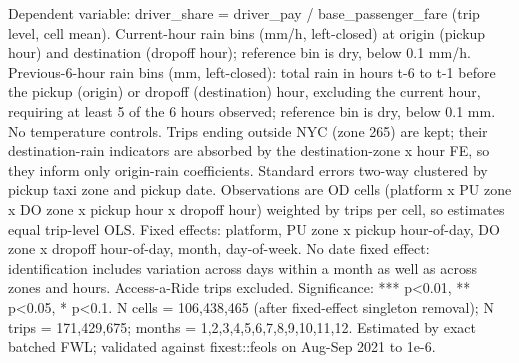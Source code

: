 \par \raggedright 
Dependent variable: driver\_share = driver\_pay / base\_passenger\_fare (trip level, cell mean). Current-hour rain bins (mm/h, left-closed) at origin (pickup hour) and destination (dropoff hour); reference bin is dry, below 0.1 mm/h. Previous-6-hour rain bins (mm, left-closed): total rain in hours t-6 to t-1 before the pickup (origin) or dropoff (destination) hour, excluding the current hour, requiring at least 5 of the 6 hours observed; reference bin is dry, below 0.1 mm. No temperature controls. Trips ending outside NYC (zone 265) are kept; their destination-rain indicators are absorbed by the destination-zone x hour FE, so they inform only origin-rain coefficients. Standard errors two-way clustered by pickup taxi zone and pickup date. Observations are OD cells (platform x PU zone x DO zone x pickup hour x dropoff hour) weighted by trips per cell, so estimates equal trip-level OLS. Fixed effects: platform, PU zone x pickup hour-of-day, DO zone x dropoff hour-of-day, month, day-of-week. No date fixed effect: identification includes variation across days within a month as well as across zones and hours. Access-a-Ride trips excluded. Significance: *** p<0.01, ** p<0.05, * p<0.1. N cells = 106,438,465 (after fixed-effect singleton removal); N trips = 171,429,675; months = 1,2,3,4,5,6,7,8,9,10,11,12. Estimated by exact batched FWL; validated against fixest::feols on Aug-Sep 2021 to 1e-6.
\par\endgroup
\ifdefined\ifclassloaded
{}
\fi
